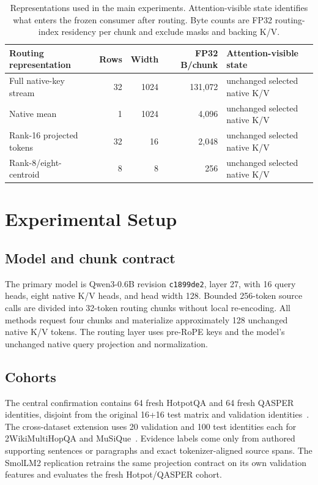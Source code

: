 \documentclass[11pt]{article}
\newcommand{\kv}{\textsc{K/V}\xspace}
\newcommand{\hotpot}{HotpotQA\xspace}
\newcommand{\qasper}{QASPER\xspace}
\newcommand{\twowiki}{2WikiMultiHopQA\xspace}
\newcommand{\musique}{MuSiQue\xspace}
\begin{document}
\begin{table}[H]
\centering
\small
\caption{Representations used in the main experiments. Attention-visible state
identifies what enters the frozen consumer after routing. Byte counts are FP32
routing-index residency per chunk and exclude masks and backing \kv.}
\label{tab:representation}
\begin{tabularx}{\linewidth}{lrrrX}
\toprule
Routing representation & Rows & Width & FP32 B/chunk & Attention-visible state \\
\midrule
Full native-key stream & 32 & 1024 & 131,072 & unchanged selected native \kv \\
Native mean & 1 & 1024 & 4,096 & unchanged selected native \kv \\
Rank-16 projected tokens & 32 & 16 & 2,048 & unchanged selected native \kv \\
Rank-8/eight-centroid & 8 & 8 & 256 & unchanged selected native \kv \\
\bottomrule
\end{tabularx}
\end{table}

\clearpage
\section{Experimental Setup}
\subsection{Model and chunk contract}
The primary model is Qwen3-0.6B revision \texttt{c1899de2}, layer 27, with 16
query heads, eight native \kv heads, and head width 128. Bounded 256-token
source calls are divided into 32-token routing chunks without local re-encoding.
All methods request four chunks and materialize approximately 128 unchanged
native \kv tokens. The routing layer uses pre-RoPE keys and the model's unchanged
native query projection and normalization.

\subsection{Cohorts}
The central confirmation contains 64 fresh \hotpot and 64 fresh \qasper
identities, disjoint from the original 16+16 test matrix and validation
identities~\cite{yang2018hotpot,dasigi2021qasper}. The cross-dataset extension
uses 20 validation and 100 test identities each for \twowiki and
\musique~\cite{ho2020twowiki,trivedi2022musique}. Evidence labels come only
from authored supporting sentences or paragraphs and exact tokenizer-aligned
source spans. The SmolLM2 replication retrains the same projection contract on
its own validation features and evaluates the fresh Hotpot/QASPER cohort.
\end{document}

